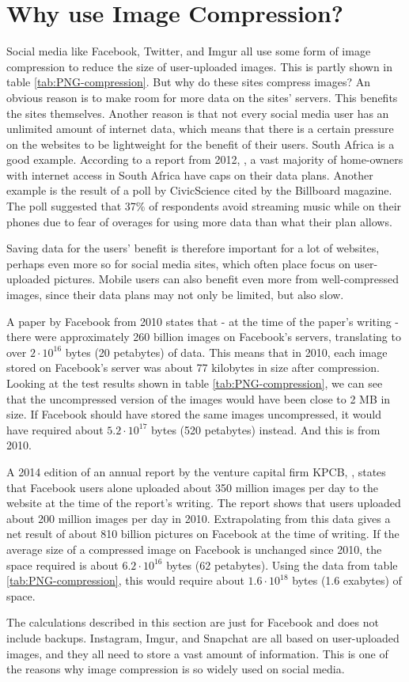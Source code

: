 \section{Why use Image Compression?}
Social media like Facebook, Twitter, and Imgur all use some form of image compression to reduce the size of user-uploaded images.
This is partly shown in table \ref{tab:PNG-compression}.
But why do these sites compress images?
An obvious reason is to make room for more data on the sites' servers.
This benefits the sites themselves.
Another reason is that not every social media user has an unlimited amount of internet data, which means that there is a certain pressure on the websites to be lightweight for the benefit of their users.
South Africa is a good example. According to a report from 2012, \citep{chetty_2012}, a vast majority of home-owners with internet access in South Africa have caps on their data plans.
Another example is the result of a poll by CivicScience \citep{tmobilemusic} cited by the Billboard magazine.
The poll suggested that 37\% of respondents avoid streaming music while on their phones due to fear of overages for using more data than what their plan allows.

Saving data for the users' benefit is therefore important for a lot of websites, perhaps even more so for social media sites, which often place focus on user-uploaded pictures.
Mobile users can also benefit even more from well-compressed images, since their data plans may not only be limited, but also slow.

A paper by Facebook from 2010 \citep{beaver2010} states that - at the time of the paper's writing - there were approximately 260 billion images on Facebook's servers, translating to over $2\cdot10^{16}$ bytes (20 petabytes) of data.
This means that in 2010, each image stored on Facebook's server was about 77 kilobytes in size after compression.
Looking at the test results shown in table \ref{tab:PNG-compression}, we can see that the uncompressed version of the images would have been close to 2 MB in size.
If Facebook should have stored the same images uncompressed, it would have required about $5.2\cdot10^{17}$ bytes (520 petabytes) instead.
And this is from 2010.

A 2014 edition of an annual report by the venture capital firm KPCB, \citep{meeker2014internet}, states that Facebook users alone uploaded about
350 million images per day to the website at the time of the report's writing.
The report shows that users uploaded about 200 million images per day in 2010.
Extrapolating from this data gives a net result of about 810 billion pictures on Facebook at the time of writing.
If the average size of a compressed image on Facebook is unchanged since 2010, the space required is about $6.2\cdot10^{16}$ bytes (62 petabytes).
Using the data from table \ref{tab:PNG-compression}, this would require about $1.6\cdot10^{18}$ bytes (1.6 exabytes) of space.

The calculations described in this section are just for Facebook and does not include backups. Instagram, Imgur,
and Snapchat are all based on user-uploaded images, and they all need to store a vast amount of information.
This is one of the reasons why image compression is so widely used on social media.
